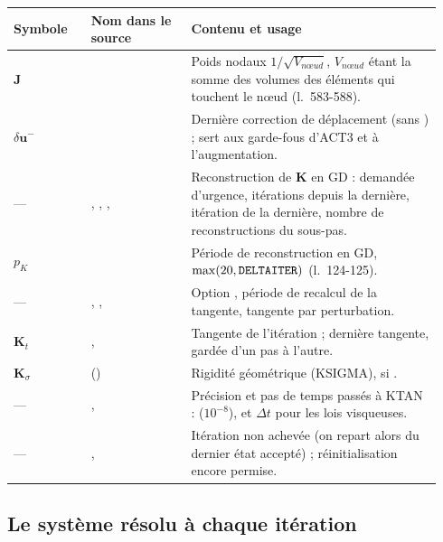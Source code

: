 \documentclass[11pt,a4paper]{article}
\makeatletter
\numberwithin{equation}{section}
\newcommand{\src}[1]{\texttt{\detokenize{#1}}}          %
\newcommand{\op}[1]{\textsf{\small #1}}                 %
\newcommand{\lig}[1]{l.~#1}
\newcommand{\vc}[1]{\symbf{#1}}                         %
\newenvironment{glossaire}[1][Glossaire]{%
  \par\smallskip\needspace{7\baselineskip}\noindent{\sffamily\bfseries\small #1}\par\nopagebreak
  \small
  \renewcommand{\arraystretch}{1.18}
  \begin{longtable}{@{}>{\raggedright\arraybackslash}p{0.17\linewidth}
                     >{\raggedright\arraybackslash}p{0.22\linewidth}
                     >{\raggedright\arraybackslash}p{0.555\linewidth}@{}}
  \toprule
  \textbf{Symbole} & \textbf{Nom dans le source} & \textbf{Contenu et usage}\\
  \midrule\endhead
  \bottomrule\endfoot}
  {\end{longtable}\addtocounter{table}{-1}\normalsize\vspace{-0.4em}}
\makeatother
\begin{document}
\begin{glossaire}
$\vc J$ & \src{ZJAC} & Poids nodaux $1/\sqrt{V_{nœud}}$, $V_{nœud}$ étant la somme des volumes des éléments qui touchent le nœud (\lig{583-588}).\\
$\delta\vc u^{-}$ & \src{zdep1d} & Dernière correction de déplacement (sans \src{LX}) ; sert aux garde-fous d'\op{ACT3} et à l'augmentation.\\
— & \src{URG}, \src{ITURG}, \src{IT_RECA}, \src{RECA_N} & Reconstruction de $\vc K$ en GD : demandée d'urgence, itérations depuis la dernière, itération de la dernière, nombre de reconstructions du sous-pas.\\
$p_K$ & \src{ITRCLC} & Période de reconstruction en GD, $\max(20, \src{DELTAITER})$ (\lig{124-125}).\\
— & \src{IKTAN}, \src{NITER_KTANGENT}, \src{IPERT} & Option \src{K_TANGENT}, période de recalcul de la tangente, tangente par perturbation.\\
$\vc K_t$ & \src{ZRIKTA}, \src{LASTKTAN} & Tangente de l'itération ; dernière tangente, gardée d'un pas à l'autre.\\
$\vc K_\sigma$ & \src{ZKSIG} (\src{IKSIA}) & Rigidité géométrique (\op{KSIGMA}), si \src{K_SIGMA}.\\
— & \src{ZPREK}, \src{DTTAN} & Précision et pas de temps passés à \op{KTAN} : \src{PRECISINTER} ($10^{-8}$), et $\Delta t$ pour les lois visqueuses.\\
— & \src{IRATE}, \src{PASREINI} & Itération non achevée (on repart alors du dernier état accepté) ; réinitialisation encore permise.\\
\end{glossaire}

\subsection{Le système résolu à chaque itération}
\label{sec:systeme}
\end{document}
